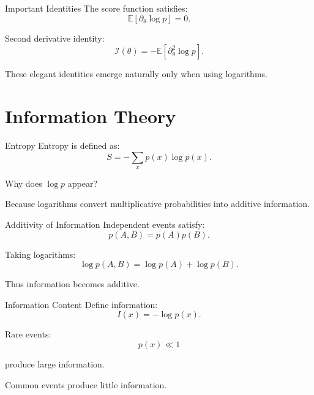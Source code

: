 \documentclass{beamer}
\begin{document}
\begin{frame}{Important Identities}
The score function satisfies:
\[
\mathbb E[\partial_\theta \log p]=0.
\]

\pause

Second derivative identity:
\[
\mathcal I(\theta)
=
-
\mathbb E
\left[
\partial_\theta^2 \log p
\right].
\]

\pause

These elegant identities emerge naturally only when using logarithms.
\end{frame}

\section{Information Theory}

\begin{frame}{Entropy}
Entropy is defined as:
\[
S
=
-
\sum_x p(x)\log p(x).
\]

\pause

Why does $\log p$ appear?

\medskip

Because logarithms convert multiplicative probabilities into additive information.
\end{frame}

\begin{frame}{Additivity of Information}
Independent events satisfy:
\[
p(A,B)=p(A)p(B).
\]

\pause

Taking logarithms:
\[
\log p(A,B)
=
\log p(A)+\log p(B).
\]

\pause

Thus information becomes additive.
\end{frame}

\begin{frame}{Information Content}
Define information:
\[
I(x)=-\log p(x).
\]

\pause

Rare events:
\[
p(x)\ll1
\]

produce large information.

\pause

Common events produce little information.
\end{frame}

\end{document}
